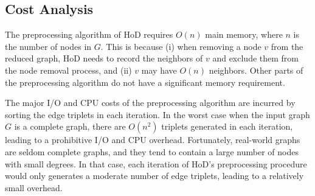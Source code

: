 \documentclass{sig-alternate}
\def\figcapup{\vspace{-2mm}}
\def\figcapdown{\vspace{-3mm}}
\def\GF{G_f}
\def\GB{G_b}
\begin{document}
\begin{sloppy}




\subsection{Cost Analysis} \label{sec:pre-complexity}

The preprocessing algorithm of HoD requires $O(n)$ main memory, where $n$ is the number of nodes in $G$. This is because (i) when removing a node $v$ from the reduced graph, HoD needs to record the neighbors of $v$ and exclude them from the node removal process, and (ii) $v$ may have $O(n)$ neighbors. Other parts of the preprocessing algorithm do not have a significant memory requirement.

The major I/O and CPU costs of the preprocessing algorithm are incurred by sorting the edge triplets in each iteration. In the worst case when the input graph $G$ is a complete graph, there are $O(n^2)$ triplets generated in each iteration, leading to a prohibitive I/O and CPU overhead. Fortunately, real-world graphs are seldom complete graphs, and they tend to contain a large number of nodes with small degrees. In that case, each iteration of HoD's preprocessing procedure would only generates a moderate number of edge triplets, leading to a relatively small overhead.


\end{sloppy}
\end{document}
